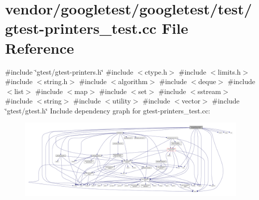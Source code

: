 \hypertarget{gtest-printers__test_8cc}{}\section{vendor/googletest/googletest/test/gtest-\/printers\+\_\+test.cc File Reference}
\label{gtest-printers__test_8cc}
{\ttfamily \#include \char`\"{}gtest/gtest-\/printers.\+h\char`\"{}}\newline
{\ttfamily \#include $<$ctype.\+h$>$}\newline
{\ttfamily \#include $<$limits.\+h$>$}\newline
{\ttfamily \#include $<$string.\+h$>$}\newline
{\ttfamily \#include $<$algorithm$>$}\newline
{\ttfamily \#include $<$deque$>$}\newline
{\ttfamily \#include $<$list$>$}\newline
{\ttfamily \#include $<$map$>$}\newline
{\ttfamily \#include $<$set$>$}\newline
{\ttfamily \#include $<$sstream$>$}\newline
{\ttfamily \#include $<$string$>$}\newline
{\ttfamily \#include $<$utility$>$}\newline
{\ttfamily \#include $<$vector$>$}\newline
{\ttfamily \#include \char`\"{}gtest/gtest.\+h\char`\"{}}\newline
Include dependency graph for gtest-\/printers\+\_\+test.cc\+:
\nopagebreak
\begin{figure}[H]
\begin{center}
\leavevmode
\includegraphics[width=350pt]{gtest-printers__test_8cc__incl}
\end{center}
\end{figure}
